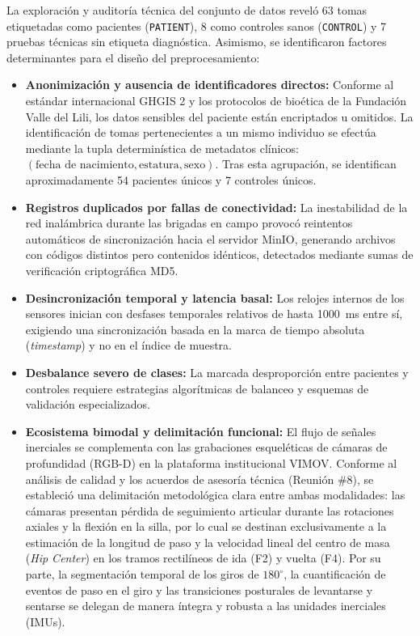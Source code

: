 \documentclass[12pt,a4paper]{article}
\begin{document}
La exploración y auditoría técnica del conjunto de datos reveló 63 tomas etiquetadas como pacientes (\texttt{PATIENT}), 8 como controles sanos (\texttt{CONTROL}) y 7 pruebas técnicas sin etiqueta diagnóstica. Asimismo, se identificaron factores determinantes para el diseño del preprocesamiento:
\begin{itemize}[itemsep=2pt]
  \item \textbf{Anonimización y ausencia de identificadores directos:} Conforme al estándar internacional GHGIS 2 y los protocolos de bioética de la Fundación Valle del Lili, los datos sensibles del paciente están encriptados u omitidos. La identificación de tomas pertenecientes a un mismo individuo se efectúa mediante la tupla determinística de metadatos clínicos: $(\text{fecha de nacimiento}, \text{estatura}, \text{sexo})$. Tras esta agrupación, se identifican aproximadamente 54 pacientes únicos y 7 controles únicos.
  \item \textbf{Registros duplicados por fallas de conectividad:} La inestabilidad de la red inalámbrica durante las brigadas en campo provocó reintentos automáticos de sincronización hacia el servidor MinIO, generando archivos con códigos distintos pero contenidos idénticos, detectados mediante sumas de verificación criptográfica MD5.
  \item \textbf{Desincronización temporal y latencia basal:} Los relojes internos de los sensores inician con desfases temporales relativos de hasta 1000~ms entre sí, exigiendo una sincronización basada en la marca de tiempo absoluta (\emph{timestamp}) y no en el índice de muestra.
  \item \textbf{Desbalance severo de clases:} La marcada desproporción entre pacientes y controles requiere estrategias algorítmicas de balanceo y esquemas de validación especializados.
  \item \textbf{Ecosistema bimodal y delimitación funcional:} El flujo de señales inerciales se complementa con las grabaciones esqueléticas de cámaras de profundidad (RGB-D) en la plataforma institucional VIMOV. Conforme al análisis de calidad y los acuerdos de asesoría técnica (Reunión \#8), se estableció una delimitación metodológica clara entre ambas modalidades: las cámaras presentan pérdida de seguimiento articular durante las rotaciones axiales y la flexión en la silla, por lo cual se destinan exclusivamente a la estimación de la longitud de paso y la velocidad lineal del centro de masa (\emph{Hip Center}) en los tramos rectilíneos de ida (F2) y vuelta (F4). Por su parte, la segmentación temporal de los giros de $180^\circ$, la cuantificación de eventos de paso en el giro y las transiciones posturales de levantarse y sentarse se delegan de manera íntegra y robusta a las unidades inerciales (IMUs).
\end{itemize}
\end{document}
